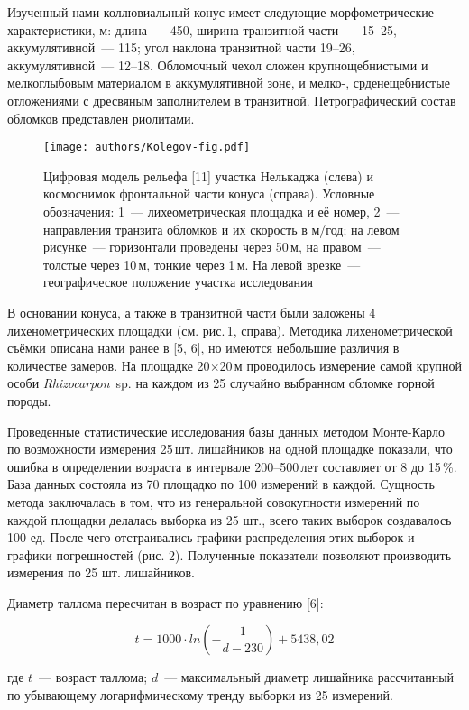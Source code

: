 Изученный нами коллювиальный конус имеет следующие морфометрические характеристики, м: длина~---  450, ширина транзитной части~---  15--25, аккумулятивной~--- 115; угол наклона транзитной части 19--26\dg, аккумулятивной~--- 12--18\dg.
Обломочный чехол сложен крупнощебнистыми и мелкоглыбовым материалом в аккумулятивной зоне, и мелко-, срденещебнистые отложениями с дресвяным заполнителем в транзитной. Петрографический состав обломков представлен риолитами.

\begin{figure}[H]
  \centering
  \texttt{[image: authors/Kolegov-fig.pdf]}
  \caption{Цифровая модель рельефа [11] участка Нелькаджа (слева) и космоснимок фронтальной части конуса (справа). Условные обозначения: 1~--- лихеометрическая площадка и её номер, 2~--- направления транзита обломков и их скорость в м/год; на левом рисунке~--- горизонтали проведены через 50\,м, на правом~--- толстые через 10\,м, тонкие через 1\,м. На левой врезке~--- географическое положение участка исследования}
  \label{fig:kolegov-fig}
\end{figure}

В основании конуса, а также в транзитной части были заложены 4 лихенометрических площадки (см. рис.\,1, справа). Методика лихенометрической съёмки описана нами ранее в [5, 6], но имеются небольшие различия в количестве замеров. На площадке 20$\times$20\,м проводилось измерение самой крупной особи \textit{Rhizocarpon}~sp. на каждом из 25 случайно выбранном обломке горной породы.

Проведенные статистические исследования базы данных методом Монте-Карло по возможности измерения 25\,шт. лишайников на одной площадке показали, что ошибка в определении возраста в интервале 200--500\,лет составляет от 8 до 15\,\%. База данных состояла из 70 площадко по 100 измерений в каждой. Сущность метода заключалась в том, что из генеральной совокупности измерений по каждой площадки делалась выборка из 25 шт., всего таких выборок создавалось 100 ед. После чего отстраивались графики распределения этих выборок и графики погрешностей (рис. 2). Полученные показатели позволяют производить измерения по 25 шт. лишайников.



Диаметр таллома пересчитан в возраст по уравнению [6]:

$$t = 1000\cdot ln{\left(-\frac{1}{d-230}\right)}+5438,02$$

где $t$~--- возраст таллома; $d$~--- максимальный диаметр лишайника рассчитанный по убывающему логарифмическому тренду выборки из 25 измерений.

